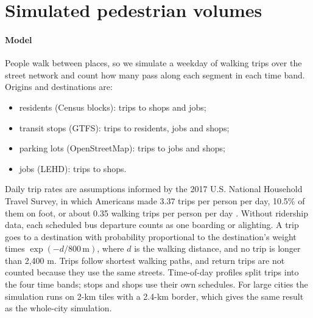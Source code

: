 \documentclass[preprint,12pt,authoryear]{elsarticle}
\newcommand{\ajustar}[1]{\adjustbox{max width=\textwidth}{#1}}
\begin{document}
\begin{table}[H]
\centering\small
\caption{Quick capture: share of future core incidents in the riskiest 10\% of network length (95\% CI, resampling 1-km zones). Chance is about 0.10.}
\label{tab:rapida}
\ajustar{}
\end{table}

\FloatBarrier
\section{Simulated pedestrian volumes}\label{app:peatones}
\paragraph{Model} People walk between places, so we simulate a weekday of walking trips over the street network and count how many pass along each segment in each time band. Origins and destinations are:
\begin{itemize}
  \item residents (Census blocks): trips to shops and jobs;
  \item transit stops (GTFS): trips to residents, jobs and shops;
  \item parking lots (OpenStreetMap): trips to jobs and shops;
  \item jobs (LEHD): trips to shops.
\end{itemize}
Daily trip rates are assumptions informed by the 2017 U.S. National Household Travel Survey, in which Americans made 3.37 trips per person per day, 10.5\% of them on foot, or about 0.35 walking trips per person per day \citep{mcguckin2018nhts}. Without ridership data, each scheduled bus departure counts as one boarding or alighting. A trip goes to a destination with probability proportional to the destination's weight times $\exp(-d/800\,\mathrm{m})$, where $d$ is the walking distance, and no trip is longer than 2,400 m. Trips follow shortest walking paths, and return trips are not counted because they use the same streets. Time-of-day profiles split trips into the four time bands; stops and shops use their own schedules. For large cities the simulation runs on 2-km tiles with a 2.4-km border, which gives the same result as the whole-city simulation.
\end{document}
